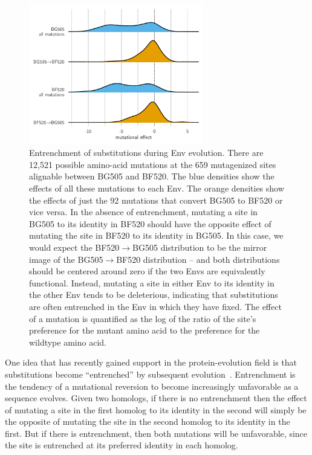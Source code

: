 \documentclass[9pt]{elife}
\begin{document}
\begin{figure}
\centerline{\includegraphics[clip=true, trim=0in 0in 0in 0in, width=0.68\textwidth]{figures/entrenchment.pdf}}
\caption{\label{fig:entrenchment}
Entrenchment of substitutions during Env evolution.
There are 12,521 possible amino-acid mutations at the 659 mutagenized sites alignable between BG505 and BF520.
The blue densities show the effects of all these mutations to each Env.
The orange densities show the effects of just the 92 mutations that convert BG505 to BF520 or vice versa.
In the absence of entrenchment, mutating a site in BG505 to its identity in BF520 should have the opposite effect of mutating the site in BF520 to its identity in BG505.
In this case, we would expect the BF520$\rightarrow$BG505 distribution to be the mirror image of the BG505$\rightarrow$BF520 distribution -- and both distributions should be centered around zero if the two Envs are equivalently functional.
Instead, mutating a site in either Env to its identity in the other Env tends to be deleterious, indicating that substitutions are often entrenched in the Env in which they have fixed.
The effect of a mutation is quantified as the log of the ratio of the site's preference for the mutant amino acid to the preference for the wildtype amino acid.
}
\end{figure}

One idea that has recently gained support in the protein-evolution field is that substitutions become ``entrenched'' by subsequent evolution~\citep{pollock2012amino,shah2015contingency,starr2017pervasive}.
Entrenchment is the tendency of a mutational reversion to become increasingly unfavorable as a sequence evolves.
Given two homologs, if there is no entrenchment then the effect of mutating a site in the first homolog to its identity in the second will simply be the opposite of mutating the site in the second homolog to its identity in the first.
But if there is entrenchment, then both mutations will be unfavorable, since the site is entrenched at its preferred identity in each homolog.
\end{document}
